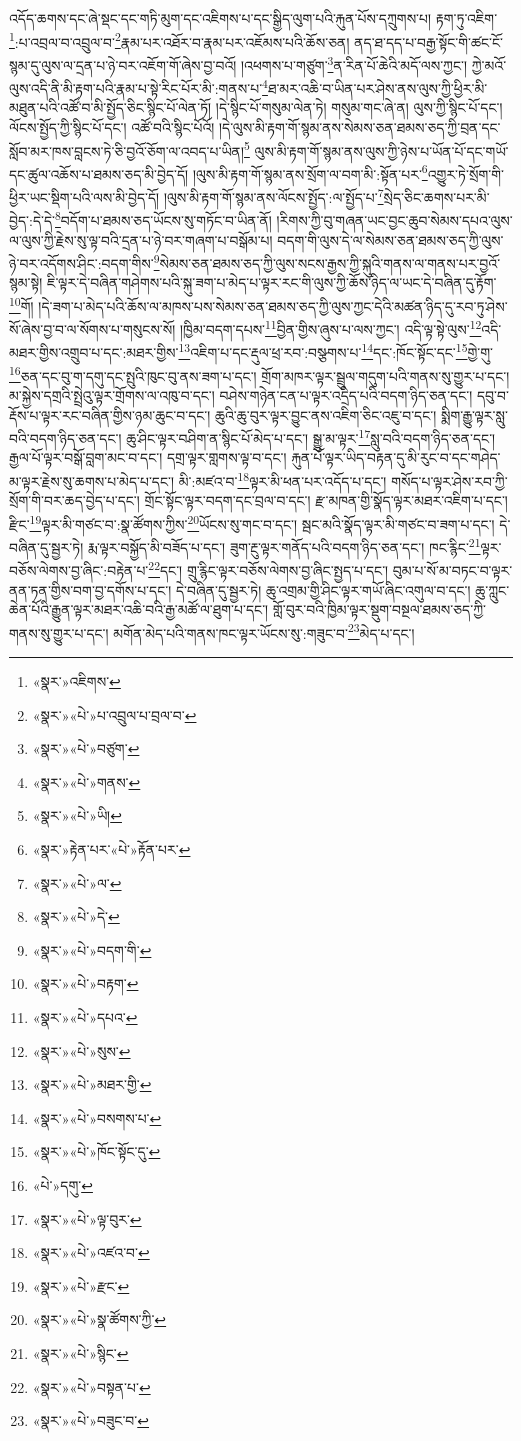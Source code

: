 འདོད་ཆགས་དང་ཞེ་སྡང་དང་གཏི་མུག་དང་འཇིགས་པ་དང་སྒྱིད་ལུག་པའི་རྐུན་པོས་དཀྲུགས་པ། རྟག་ཏུ་འཇིག་\footnote{«སྣར་»འཇིགས་}:པ་འབྲལ་བ་འབྲུལ་བ་\footnote{«སྣར་»«པེ་»པ་འབྲུལ་པ་བྲལ་བ་}རྣམ་པར་འཐོར་བ་རྣམ་པར་འཇོམས་པའི་ཆོས་ཅན། ནད་ཐ་དད་པ་བརྒྱ་སྟོང་གི་ཚང་ངོ་སྙམ་དུ་ལུས་ལ་དྲན་པ་ཉེ་བར་འཇོག་གོ་ཞེས་བྱ་བའོ། །འཕགས་པ་གཙུག་\footnote{«སྣར་»«པེ་»བཙུག་}ན་རིན་པོ་ཆེའི་མདོ་ལས་ཀྱང་། ཀྱེ་མའོ་ལུས་འདི་ནི་མི་རྟག་པའི་རྣམ་པ་སྟེ་རིང་པོར་མི་:གནས་པ་\footnote{«སྣར་»«པེ་»གནས་}ཐ་མར་འཆི་བ་ཡིན་པར་ཤེས་ནས་ལུས་ཀྱི་ཕྱིར་མི་མཐུན་པའི་འཚོ་བ་མི་སྤྱོད་ཅིང་སྙིང་པོ་ལེན་ཏོ། །དེ་སྙིང་པོ་གསུམ་ལེན་ཏེ། གསུམ་གང་ཞེ་ན། ལུས་ཀྱི་སྙིང་པོ་དང་། ལོངས་སྤྱོད་ཀྱི་སྙིང་པོ་དང་། འཚོ་བའི་སྙིང་པོའོ། །དེ་ལུས་མི་རྟག་གོ་སྙམ་ནས་སེམས་ཅན་ཐམས་ཅད་ཀྱི་བྲན་དང་སློབ་མར་ཁས་བླངས་ཏེ་ཅི་བྱའོ་ཅོག་ལ་འབད་པ་ཡིན།\footnote{«སྣར་»«པེ་»ཡི།} ལུས་མི་རྟག་གོ་སྙམ་ནས་ལུས་ཀྱི་ཉེས་པ་ཡོན་པོ་དང་གཡོ་དང་ཚུལ་འཆོས་པ་ཐམས་ཅད་མི་བྱེད་དོ། །ལུས་མི་རྟག་གོ་སྙམ་ནས་སྲོག་ལ་བག་མི་:སྟོན་པར་\footnote{«སྣར་»རྟེན་པར་«པེ་»རྟོན་པར་}འགྱུར་ཏེ་སྲོག་གི་ཕྱིར་ཡང་སྡིག་པའི་ལས་མི་བྱེད་དོ། །ལུས་མི་རྟག་གོ་སྙམ་ནས་ལོངས་སྤྱོད་:ལ་སྤྱོད་པ་\footnote{«སྣར་»«པེ་»ལ་}སྲེད་ཅིང་ཆགས་པར་མི་བྱེད་:དེ་དེ་\footnote{«སྣར་»«པེ་»དེ་}བདོག་པ་ཐམས་ཅད་ཡོངས་སུ་གཏོང་བ་ཡིན་ནོ། །རིགས་ཀྱི་བུ་གཞན་ཡང་བྱང་ཆུབ་སེམས་དཔའ་ལུས་ལ་ལུས་ཀྱི་རྗེས་སུ་ལྟ་བའི་དྲན་པ་ཉེ་བར་གཞག་པ་བསྒོམ་པ། བདག་གི་ལུས་དེ་ལ་སེམས་ཅན་ཐམས་ཅད་ཀྱི་ལུས་ཉེ་བར་འདོགས་ཤིང་:བདག་གིས་\footnote{«སྣར་»«པེ་»བདག་གི་}སེམས་ཅན་ཐམས་ཅད་ཀྱི་ལུས་སངས་རྒྱས་ཀྱི་སྐུའི་གནས་ལ་གནས་པར་བྱའོ་སྙམ་སྟེ། ཇི་ལྟར་དེ་བཞིན་གཤེགས་པའི་སྐུ་ཟག་པ་མེད་པ་ལྟར་རང་གི་ལུས་ཀྱི་ཆོས་ཉིད་ལ་ཡང་དེ་བཞིན་དུ་རྟོག་\footnote{«སྣར་»«པེ་»བརྟག་}གོ། །དེ་ཟག་པ་མེད་པའི་ཆོས་ལ་མཁས་པས་སེམས་ཅན་ཐམས་ཅད་ཀྱི་ལུས་ཀྱང་དེའི་མཚན་ཉིད་དུ་རབ་ཏུ་ཤེས་སོ་ཞེས་བྱ་བ་ལ་སོགས་པ་གསུངས་སོ། །ཁྱིམ་བདག་དཔས་\footnote{«སྣར་»«པེ་»དཔའ་}བྱིན་གྱིས་ཞུས་པ་ལས་ཀྱང་། འདི་ལྟ་སྟེ་ལུས་\footnote{«སྣར་»«པེ་»སུས་}འདི་མཐར་གྱིས་འགྲུབ་པ་དང་:མཐར་གྱིས་\footnote{«སྣར་»«པེ་»མཐར་གྱི་}འཇིག་པ་དང་རྡུལ་ཕྲ་རབ་:བསྩགས་པ་\footnote{«སྣར་»«པེ་»བསགས་པ་}དང་:ཁོང་སྟོང་དང་\footnote{«སྣར་»«པེ་»ཁོང་སྟོང་དུ་}གྱེ་གུ་\footnote{«པེ་»དགུ་}ཅན་དང་བུ་ག་དགུ་དང་སྤུའི་ཁུང་བུ་ནས་ཟག་པ་དང་། གྲོག་མཁར་ལྟར་སྦྲུལ་གདུག་པའི་གནས་སུ་གྱུར་པ་དང་། མ་སྐྱེས་དགྲའི་སྤྲེའུ་ལྟར་གྲོགས་ལ་འཁུ་བ་དང་། བཤེས་གཉེན་ངན་པ་ལྟར་འདྲིད་པའི་བདག་ཉིད་ཅན་དང་། དབུ་བ་རྡོས་པ་ལྟར་རང་བཞིན་གྱིས་ཉམ་ཆུང་བ་དང་། ཆུའི་ཆུ་བུར་ལྟར་བྱུང་ནས་འཇིག་ཅིང་འཇུ་བ་དང་། སྨིག་རྒྱུ་ལྟར་སླུ་བའི་བདག་ཉིད་ཅན་དང་། ཆུ་ཤིང་ལྟར་བཤིག་ན་སྙིང་པོ་མེད་པ་དང་། སྒྱུ་མ་ལྟར་\footnote{«སྣར་»«པེ་»ལྟ་བུར་}སླུ་བའི་བདག་ཉིད་ཅན་དང་། རྒྱལ་པོ་ལྟར་བསྒོ་བླག་མང་བ་དང་། དགྲ་ལྟར་གླགས་ལྟ་བ་དང་། རྐུན་པོ་ལྟར་ཡིད་བརྟན་དུ་མི་རུང་བ་དང་གཤེད་མ་ལྟར་རྗེས་སུ་ཆགས་པ་མེད་པ་དང་། མི་:མཛའ་བ་\footnote{«སྣར་»«པེ་»འཛའ་བ་}ལྟར་མི་ཕན་པར་འདོད་པ་དང་། གསོད་པ་ལྟར་ཤེས་རབ་ཀྱི་སྲོག་གི་བར་ཆད་བྱེད་པ་དང་། གྲོང་སྟོང་ལྟར་བདག་དང་བྲལ་བ་དང་། རྫ་མཁན་གྱི་སྣོད་ལྟར་མཐར་འཇིག་པ་དང་། རྫིང་\footnote{«སྣར་»«པེ་»རྫང་}ལྟར་མི་གཙང་བ་:སྣ་ཚོགས་ཀྱིས་\footnote{«སྣར་»«པེ་»སྣ་ཚོགས་ཀྱི་}ཡོངས་སུ་གང་བ་དང་། སྦང་མའི་སྣོད་ལྟར་མི་གཙང་བ་ཟག་པ་དང་། དེ་བཞིན་དུ་སྦྱར་ཏེ། རྨ་ལྟར་བསྐྱོད་མི་བཟོད་པ་དང་། ཟུག་རྔུ་ལྟར་གནོད་པའི་བདག་ཉིད་ཅན་དང་། ཁང་རྙིང་\footnote{«སྣར་»«པེ་»སྙིང་}ལྟར་བཅོས་ལེགས་བྱ་ཞིང་:བརྟེན་པ་\footnote{«སྣར་»«པེ་»བསྟན་པ་}དང་། གྲུ་རྙིང་ལྟར་བཅོས་ལེགས་བྱ་ཞིང་སྤྱད་པ་དང་། བུམ་པ་སོ་མ་བཏང་བ་ལྟར་ནན་ཏན་གྱིས་བག་བྱ་དགོས་པ་དང་། དེ་བཞིན་དུ་སྦྱར་ཏེ། ཆུ་འགྲམ་གྱི་ཤིང་ལྟར་གཡོ་ཞིང་འགུལ་བ་དང་། ཆུ་ཀླུང་ཆེན་པོའི་རྒྱུན་ལྟར་མཐར་འཆི་བའི་རྒྱ་མཚོ་ལ་ཐུག་པ་དང་། གློ་བུར་བའི་ཁྱིམ་ལྟར་སྡུག་བསྔལ་ཐམས་ཅད་ཀྱི་གནས་སུ་གྱུར་པ་དང་། མགོན་མེད་པའི་གནས་ཁང་ལྟར་ཡོངས་སུ་:གཟུང་བ་\footnote{«སྣར་»«པེ་»བཟུང་བ་}མེད་པ་དང་། 